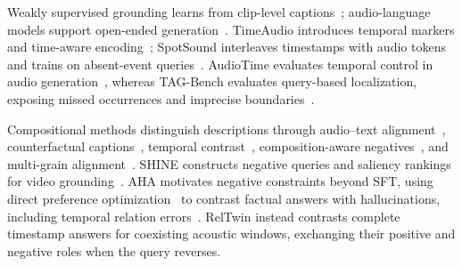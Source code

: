 Weakly supervised grounding learns from clip-level captions~\cite{xu2024wstag}; audio-language models support open-ended generation~\cite{deshmukh2023pengi,chu2024qwen2audio,goel2025af3}. TimeAudio introduces temporal markers and time-aware encoding~\cite{wang2026timeaudio}; SpotSound interleaves timestamps with audio tokens and trains on absent-event queries~\cite{sun2026spotsound}. AudioTime evaluates temporal control in audio generation~\cite{xie2024audiotime}, whereas TAG-Bench evaluates query-based localization, exposing missed occurrences and imprecise boundaries~\cite{dai2026tagbench}.

Compositional methods distinguish descriptions through audio--text alignment~\cite{wu2023clap}, counterfactual captions~\cite{vosoughi2024counterfactual}, temporal contrast~\cite{yuan2024tclap}, composition-aware negatives~\cite{ghosh2024compa}, and multi-grain alignment~\cite{ren2026costala}. SHINE constructs negative queries and saliency rankings for video grounding~\cite{cheng2024shine}. AHA motivates negative constraints beyond SFT, using direct preference optimization~\cite{rafailov2023dpo} to contrast factual answers with hallucinations, including temporal relation errors~\cite{chen2026aha}. RelTwin instead contrasts complete timestamp answers for coexisting acoustic windows, exchanging their positive and negative roles when the query reverses.
